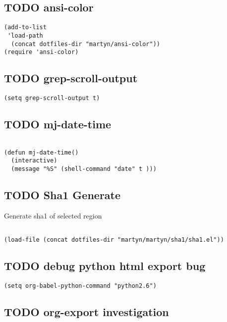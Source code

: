\documentclass[colorlinks=true,urlcolor=blue,listings-sv]{article}
\begin{document}
\subsection{\textbf{TODO} ansi-color}
\label{sec-2-4}


\lstset{language=Lisp}
\begin{lstlisting}
(add-to-list 
 'load-path
  (concat dotfiles-dir "martyn/ansi-color"))
(require 'ansi-color)
\end{lstlisting}
\subsection{\textbf{TODO} grep-scroll-output}
\label{sec-2-5}


\lstset{language=Lisp}
\begin{lstlisting}
(setq grep-scroll-output t)
\end{lstlisting}
\subsection{\textbf{TODO} mj-date-time}
\label{sec-2-6}


\lstset{language=Lisp}
\begin{lstlisting}

(defun mj-date-time()
  (interactive)
  (message "%S" (shell-command "date" t )))
\end{lstlisting}
\subsection{\textbf{TODO} Sha1 Generate}
\label{sec-2-7}

Generate sha1 of selected region


\lstset{language=Lisp}
\begin{lstlisting}

(load-file (concat dotfiles-dir "martyn/martyn/sha1/sha1.el"))
\end{lstlisting}
\subsection{\textbf{TODO} debug python html export bug}
\label{sec-2-8}



\lstset{language=Lisp}
\begin{lstlisting}
(setq org-babel-python-command "python2.6")
\end{lstlisting}
\subsection{\textbf{TODO} org-export investigation}
\label{sec-2-9}
\end{document}
